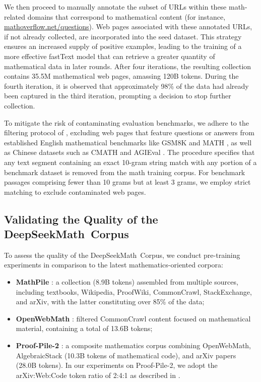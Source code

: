 \begin{itemize}[topsep=0pt]
We then proceed to manually annotate the subset of URLs within these math-related domains that correspond to mathematical content (for instance, \url{mathoverflow.net/questions}). Web pages associated with these annotated URLs, if not already collected, are incorporated into the seed dataset. This strategy ensures an increased supply of positive examples, leading to the training of a more effective fastText model that can retrieve a greater quantity of mathematical data in later rounds. After four iterations, the resulting collection contains 35.5M mathematical web pages, amassing 120B tokens. During the fourth iteration, it is observed that approximately 98\% of the data had already been captured in the third iteration, prompting a decision to stop further collection.

To mitigate the risk of contaminating evaluation benchmarks, we adhere to the filtering protocol of \cite{deepseek-coder}, excluding web pages that feature questions or answers from established English mathematical benchmarks like GSM8K \citep{gsm8k} and MATH \citep{MATH}, as well as Chinese datasets such as CMATH \citep{wei2023cmath} and AGIEval \citep{agieval}. The procedure specifies that any text segment containing an exact 10-gram string match with any portion of a benchmark dataset is removed from the math training corpus. For benchmark passages comprising fewer than 10 grams but at least 3 grams, we employ strict matching to exclude contaminated web pages.

\subsection{Validating the Quality of the DeepSeekMath~Corpus}

To assess the quality of the DeepSeekMath~Corpus, we conduct pre-training experiments in comparison to the latest mathematics-oriented corpora:

\begin{itemize}[topsep=0pt]
    \item \textbf{MathPile} \citep{mathpile}: a collection (8.9B tokens) assembled from multiple sources, including textbooks, Wikipedia, ProofWiki, CommonCrawl, StackExchange, and arXiv, with the latter constituting over 85\% of the data;
    \item \textbf{OpenWebMath} \citep{openwebmath}: filtered CommonCrawl content focused on mathematical material, containing a total of 13.6B tokens;
    \item \textbf{Proof-Pile-2} \citep{llemma}: a composite mathematics corpus combining OpenWebMath, AlgebraicStack (10.3B tokens of mathematical code), and arXiv papers (28.0B tokens). In our experiments on Proof-Pile-2, we adopt the arXiv:Web:Code token ratio of 2:4:1 as described in \cite{llemma}.
\end{itemize}


\end{itemize}
